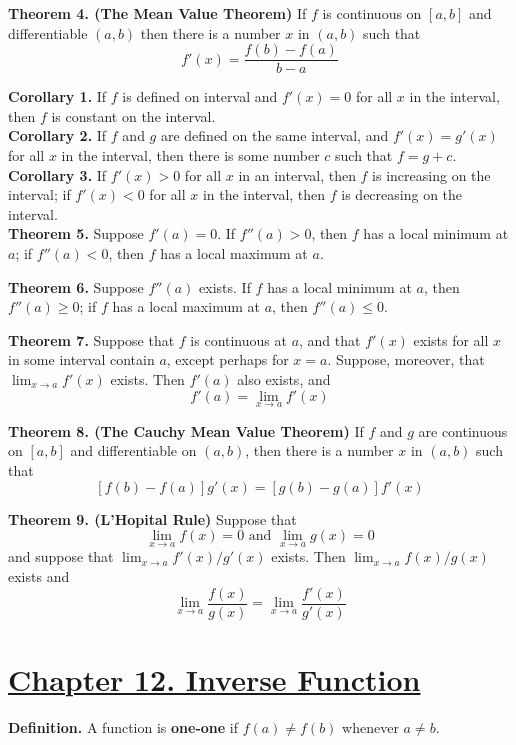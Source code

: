 \documentclass[10pt,letterpaper]{article}
\begin{document}
	\textbf{Theorem 4. (The Mean Value Theorem)} If $f$ is continuous on $[a, b]$ and differentiable $(a, b)$
	then there is a number $x$ in $(a, b)$ such that
	$$f'(x) = \dfrac{f(b) - f(a)}{b - a}$$
	
	\textbf{Corollary 1. } If $f$ is defined on interval and $f'(x) = 0$ for all $x$ in the interval,
	then $f$ is constant on the interval. \\
	
	\textbf{Corollary 2. } If $f$ and $g$ are defined on the same interval, and $f'(x) = g'(x)$ for all
	$x$ in the interval, then there is some number $c$ such that $f = g + c$.\\
	
	\textbf{Corollary 3. } If $f'(x) > 0$ for all $x$ in an interval, then $f$ is increasing on the interval;
	if $f'(x) < 0$ for all $x$ in the interval, then $f$ is decreasing on the interval. \\
	
	\textbf{Theorem 5. } Suppose $f'(a) = 0$. If $f''(a) > 0$, then $f$ has a local
	minimum at $a$; if $f''(a) < 0$, then $f$ has a local maximum at $a$.
	
	\textbf{Theorem 6. } Suppose $f''(a)$ exists. If $f$ has a local minimum 
	at $a$, then $f''(a) \geq 0$; if $f$ has a local maximum at $a$, then $f''(a) \leq 0$.
	
	\textbf{Theorem 7. } Suppose that $f$ is continuous at $a$, and that $f'(x)$
	exists for all $x$ in some interval contain $a$, except perhaps for $x = a$. 
	Suppose, moreover, that $\displaystyle\lim_{x\to a}f'(x)$ exists. Then 
	$f'(a)$ also exists, and 
	$$f'(a) = \displaystyle\lim_{x\to a}f'(x)$$
	
	\textbf{Theorem 8. (The Cauchy Mean Value Theorem)} If $f$ and $g$ are continuous on $[a, b]$ and differentiable 
	on $(a, b)$, then there is a number $x$ in $(a, b)$ such that
	$$[f(b) - f(a)]g'(x) = [g(b) - g(a)]f'(x)$$
	
	
	\textbf{Theorem 9. (L'Hopital Rule)} Suppose that 
	$$\displaystyle\lim_{x\to a}f(x) = 0 \text{ and } \displaystyle\lim_{x\to a}g(x) = 0$$
	and suppose that $\displaystyle\lim_{x\to a}f'(x)/g'(x)$ exists. Then $\displaystyle\lim_{x\to a}
	f(x)/g(x)$ exists and 
	$$\displaystyle\lim_{x\to a}\dfrac{f(x)}{g(x)} = \displaystyle\lim_{x\to a}\dfrac{f'(x)}{g'(x)}$$
	
	
	\section*{{\color{red}\underline{Chapter 12. Inverse Function}}}
	\textbf{Definition. } A function is \textbf{one-one} if $f(a) \neq f(b)$ whenever $a \neq b$. \\
	
\end{document}
